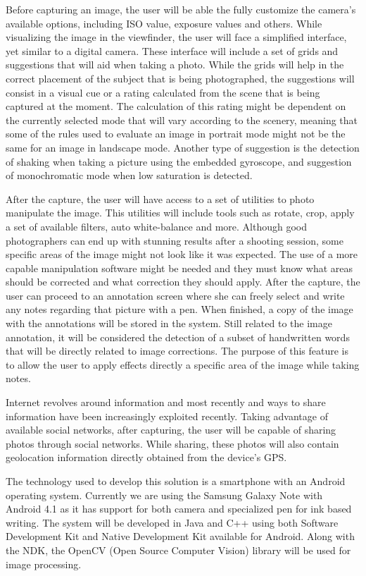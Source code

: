 Before capturing an image, the user will be able the fully customize the camera's available options, including ISO value, exposure values and others. While visualizing the image in the viewfinder, the user will face a simplified interface, yet similar to a digital camera. 
These interface will include a set of grids and suggestions that will aid when taking a photo. While the grids will help in the correct placement of the subject that is being photographed, the suggestions will consist in a visual cue or a rating calculated from the scene that is being captured at the moment. 
The calculation of this rating might be dependent on the currently selected mode that will vary according to the scenery, meaning that some of the rules used to evaluate an image in portrait mode might not be the same for an image in landscape mode. Another type of suggestion is the detection of shaking when taking a picture using the embedded gyroscope, and suggestion of monochromatic mode when low saturation is detected.

After the capture, the user will have access to a set of utilities to photo manipulate the image. This utilities will include tools such as rotate, crop, apply a set of available filters, auto white-balance and  more.
Although good photographers can end up with stunning results after a shooting session, some specific areas of the image might not look like it was expected. The use of a more capable manipulation software might be needed and they must know what areas should be corrected and what correction they should apply. After the capture, the user can proceed to an annotation screen where she can freely select and write any notes regarding that picture with a pen. When finished, a copy of the image with the annotations will be stored in the system. Still related to the image annotation, it will be considered the detection of a subset of handwritten words that will be directly related to image corrections. The purpose of this feature is to allow the user to apply effects directly a specific area of the image while taking notes.

Internet revolves around information and most recently and ways to share information have been increasingly exploited recently. Taking advantage of available social networks, after capturing, the user will be capable of sharing photos through social networks. While sharing, these photos will also contain geolocation information directly obtained from the device's GPS.

The technology used to develop this solution is a smartphone with an Android operating system. Currently we are using the Samsung Galaxy Note with Android 4.1 as it has support for both camera and specialized pen for ink based writing. The system will be developed in Java and C++ using both Software Development Kit \cite{SDK} and Native Development Kit \cite{NDK} available for Android.  Along with the NDK, the OpenCV (Open Source Computer Vision) \cite{OCV} library will be used for image processing.


